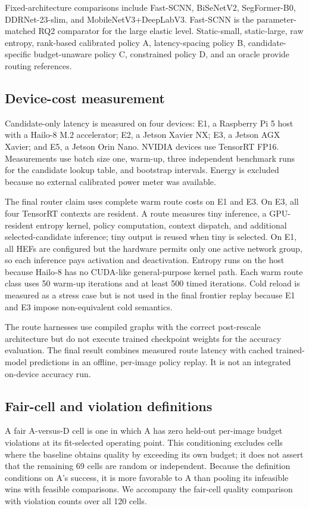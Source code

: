 \documentclass[a4paper,review,12pt]{elsarticle}
\begin{document}
Fixed-architecture comparisons include Fast-SCNN, BiSeNetV2, SegFormer-B0, DDRNet-23-slim, and MobileNetV3+DeepLabV3. Fast-SCNN is the parameter-matched RQ2 comparator for the large elastic level. Static-small, static-large, raw entropy, rank-based calibrated policy A, latency-spacing policy B, candidate-specific budget-unaware policy C, constrained policy D, and an oracle provide routing references.

\subsection{Device-cost measurement}

Candidate-only latency is measured on four devices: E1, a Raspberry Pi 5 host with a Hailo-8 M.2 accelerator; E2, a Jetson Xavier NX; E3, a Jetson AGX Xavier; and E5, a Jetson Orin Nano. NVIDIA devices use TensorRT FP16. Measurements use batch size one, warm-up, three independent benchmark runs for the candidate lookup table, and bootstrap intervals. Energy is excluded because no external calibrated power meter was available.

The final router claim uses complete warm route costs on E1 and E3. On E3, all four TensorRT contexts are resident. A route measures tiny inference, a GPU-resident entropy kernel, policy computation, context dispatch, and additional selected-candidate inference; tiny output is reused when tiny is selected. On E1, all HEFs are configured but the hardware permits only one active network group, so each inference pays activation and deactivation. Entropy runs on the host because Hailo-8 has no CUDA-like general-purpose kernel path. Each warm route class uses 50 warm-up iterations and at least 500 timed iterations. Cold reload is measured as a stress case but is not used in the final frontier replay because E1 and E3 impose non-equivalent cold semantics.

The route harnesses use compiled graphs with the correct post-rescale architecture but do not execute trained checkpoint weights for the accuracy evaluation. The final result combines measured route latency with cached trained-model predictions in an offline, per-image policy replay. It is not an integrated on-device accuracy run.

\subsection{Fair-cell and violation definitions}

A fair A-versus-D cell is one in which A has zero held-out per-image budget violations at its fit-selected operating point. This conditioning excludes cells where the baseline obtains quality by exceeding its own budget; it does not assert that the remaining 69 cells are random or independent. Because the definition conditions on A's success, it is more favorable to A than pooling its infeasible wins with feasible comparisons. We accompany the fair-cell quality comparison with violation counts over all 120 cells.
\end{document}
